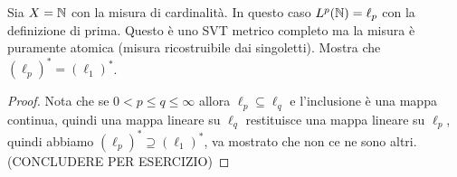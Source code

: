 \begin{exercise}
    Sia $X=\mathbb{N}$ con la misura di cardinalit\`a. In questo caso $L^p(\mathbb{N})=\ell_p$ con la definizione di prima. Questo \`e uno SVT metrico completo ma la misura \`e puramente atomica (misura ricostruibile dai singoletti). Mostra che $(\ell_p)^\ast=(\ell_1)^\ast$.
\end{exercise}
\begin{proof}
Nota che se $0<p\leq q\leq \infty$ allora $\ell_p\subseteq \ell_q$ e l'inclusione \`e una mappa continua, quindi una mappa lineare su $\ell_q$ restituisce una mappa lineare su $\ell_p$, quindi abbiamo $(\ell_p)^\ast\supseteq(\ell_1)^\ast$, va mostrato che non ce ne sono altri.(CONCLUDERE PER ESERCIZIO)
\end{proof}